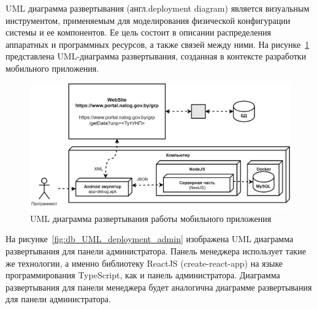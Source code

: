 UML диаграмма развертывания (англ.deployment diagram) является визуальным инструментом,
применяемым для моделирования физической конфигурации системы и ее компонентов.
Ее цель состоит в описании распределения аппаратных и программных ресурсов,
а также связей между ними.
На рисунке~\ref{fig:db_UML_deployment_mobile} представлена UML-диаграмма развертывания,
созданная в контексте разработки мобильного приложения.




\begin{figure}[!h]
    \centering

    \includegraphics[width=13cm]
    {images/UML/deployment/mobile.png}

    \caption{UML диаграмма развертывания работы мобильного приложения}

    \label{fig:db_UML_deployment_mobile}
\end{figure}

На рисунке~\ref{fig:db_UML_deployment_admin} изображена UML диаграмма развертывания для панели администратора.
Панель менеджера использует такие же технологии, а именно библиотеку ReactJS (create-react-app) на языке программирования TypeScript,
как и панель администратора.
Диаграмма развертывания для панели менеджера будет аналогична диаграмме развертывания для панели администратора.

